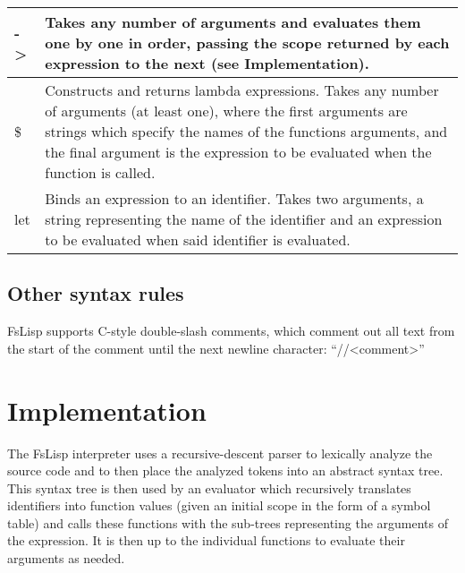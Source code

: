 \documentclass[11pt]{article}
\begin{document}
\begin{tabularx}{\textwidth} { | >{\raggedright\arraybackslash}p{3cm} | >{\raggedright\arraybackslash}X | }
            \hline
            -\textgreater &
            Takes any number of arguments and evaluates them one by one in order, passing the scope returned by each expression to the next
            (see Implementation). \\
            \hline
            \$ &
            Constructs and returns lambda expressions. Takes any number of arguments (at least one), where the first arguments are strings
            which specify the names of the functions arguments, and the final argument is the expression to be evaluated when the function is called.\\
            \hline
            let &
            Binds an expression to an identifier. Takes two arguments, a string representing the name of the identifier and an expression to be evaluated
            when said identifier is evaluated. \\
            \hline
        \end{tabularx}

    \subsection{Other syntax rules}
        FsLisp supports C-style double-slash comments, which comment out all text from the start of the comment until the next newline character: “//\textless comment\textgreater”


\section{Implementation}
The FsLisp interpreter uses a recursive-descent parser to lexically analyze the source code and to then place the analyzed tokens into an abstract syntax tree. This syntax tree is then used by an evaluator which recursively translates identifiers into function values (given an initial scope in the form of a symbol table) and calls these functions with the sub-trees representing the arguments of the expression. It is then up to the individual functions to evaluate their arguments as needed.
\end{document}

